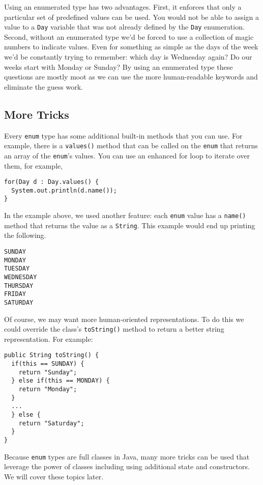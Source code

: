Using an enumerated type has two advantages.  First, it enforces
that only a particular set of predefined values can be used.  You
would not be able to assign a value to a \texttt{Day} 
variable that was not already defined by the \texttt{Day}
enumeration. Second, without an enumerated type we'd be forced
to use a collection of \glspl{magic number} to indicate values.  
Even for something as simple as the days of the week we'd be
constantly trying to remember: which day is Wednesday again?
Do our weeks start with Monday or Sunday?  By
using an enumerated type these questions are mostly moot as
we can use the more human-readable keywords and eliminate
the guess work.

\subsection{More Tricks}

Every \texttt{enum} type has some additional built-in
methods that you can use.  For example, there is a \texttt{values()}
method that can be called on the \texttt{enum} that
returns an array of the \texttt{enum}'s values.  You
can use an enhanced for loop to iterate over them, for example, 

\begin{verbatim}
for(Day d : Day.values() {
  System.out.println(d.name());
}
\end{verbatim}

In the example above, we used another feature: each 
\texttt{enum} value has a \texttt{name()} 
method that returns the value as a \texttt{String}.
This example would end up printing the following.

\begin{verbatim}
SUNDAY
MONDAY
TUESDAY
WEDNESDAY
THURSDAY
FRIDAY
SATURDAY
\end{verbatim}

Of course, we may want more human-oriented representations.  
To do this we could override the class's \texttt{toString()}
method to return a better string representation.  For example:

\begin{verbatim}
public String toString() {
  if(this == SUNDAY) {
    return "Sunday";
  } else if(this == MONDAY) {
    return "Monday";
  }
  ...
  } else {
    return "Saturday";
  }
}
\end{verbatim}

Because \texttt{enum} types are full classes in Java, 
many more tricks can be used that leverage the power of classes
including using additional state and constructors.  We will cover
these topics later.







